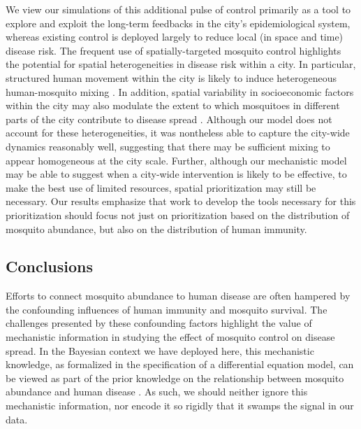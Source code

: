 \documentclass[10pt,letterpaper]{article}
\begin{document}
We view our simulations of this additional pulse of control primarily as a tool to explore and exploit the long-term feedbacks in the city's epidemiological system, whereas existing control is deployed largely to reduce local (in space and time) disease risk.
The frequent use of spatially-targeted mosquito control highlights the potential for spatial heterogeneities in disease risk within a city.
In particular, structured human movement within the city is likely to induce heterogeneous human-mosquito mixing \cite{Adams2009, Cosner2009a, Stoddard2009}.
In addition, spatial variability in socioeconomic factors within the city may also modulate the extent to which mosquitoes in different parts of the city contribute to disease spread \cite{Mondini2008, Honorio2009, Hu2012, DeMattosAlmeida2007}.
Although our model does not account for these heterogeneities, it was nontheless able to capture the city-wide dynamics reasonably well, suggesting that there may be sufficient mixing to appear homogeneous at the city scale.
Further, although our mechanistic model may be able to suggest when a city-wide intervention is likely to be effective, to make the best use of limited resources, spatial prioritization may still be necessary.
Our results emphasize that work to develop the tools necessary for this prioritization should focus not just on prioritization based on the distribution of mosquito abundance, but also on the distribution of human immunity.

\subsection*{Conclusions}

Efforts to connect mosquito abundance to human disease are often hampered by the confounding influences of human immunity and mosquito survival.
The challenges presented by these confounding factors highlight the value of mechanistic information in studying the effect of mosquito control on disease spread.
In the Bayesian context we have deployed here, this mechanistic knowledge, as formalized in the specification of a differential equation model, can be viewed as part of the prior knowledge on the relationship between mosquito abundance and human disease \cite{Ellner1998, Wikle2010}.
As such, we should neither ignore this mechanistic information, nor encode it so rigidly that it swamps the signal in our data.
\end{document}
